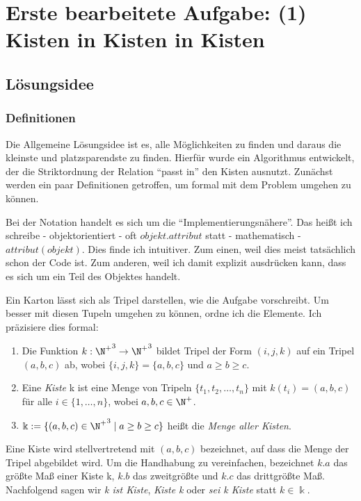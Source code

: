 \section{Erste bearbeitete Aufgabe: (1) Kisten in Kisten in Kisten}
\subsection{Lösungsidee}
\subsubsection{Definitionen}
Die Allgemeine Lösungsidee ist es, alle Möglichkeiten zu finden und daraus die kleinste und platzsparendste zu finden.
Hierfür wurde ein Algorithmus entwickelt, der die Striktordnung der Relation ``passt in'' den Kisten ausnutzt.
Zunächst werden ein paar Definitionen getroffen, um formal mit dem Problem umgehen zu können.
\begin{bem}
 Bei der Notation handelt es sich um die ``Implementierungsnähere''.
 Das heißt ich schreibe - objektorientiert - oft $objekt.attribut$ statt - mathematisch - $attribut(objekt)$.
 Dies finde ich intuitiver. Zum einen, weil dies meist tatsächlich schon der Code ist.
 Zum anderen, weil ich damit explizit ausdrücken kann, dass es sich um ein Teil des Objektes handelt.
\end{bem}
Ein Karton lässt sich als Tripel darstellen, wie die Aufgabe vorschreibt. Um besser mit diesen Tupeln umgehen zu können,
ordne ich die Elemente. Ich präzisiere dies formal:
\begin{defi}[Kiste] \hfill
\begin{enumerate}
 \item Die Funktion $k: {\N^+}^3 \to {\N^+}^3$ bildet Tripel der Form $(i,j,k)$ auf ein Tripel $(a,b,c)$ ab, wobei $\{i,j,k\} = \{a,b,c\}$ und $a \geq b \geq c$.
 \item Eine \emph{Kiste} k ist eine Menge von Tripeln $\{t_1, t_2, \dots, t_n\}$ mit $k(t_i) = (a,b,c)$ für alle $i \in \{1,\dots,n\}$, wobei $a,b,c \in \N^+$.
 \item $\Bbbk := \{(a,b,c) \in {\N^+}^3 \mid a \geq b \geq c\}$ heißt die \emph{Menge aller Kisten}.
\end{enumerate}
\end{defi}
\begin{bem}
 Eine Kiste wird stellvertretend mit $(a,b,c)$ bezeichnet, auf dass die Menge der Tripel abgebildet wird. 
 Um die Handhabung zu vereinfachen, bezeichnet $k.a$ das größte Maß einer Kiste k, $k.b$ das zweitgrößte und $k.c$ das drittgrößte Maß. \\
 Nachfolgend sagen wir \emph{k ist Kiste}, \emph{Kiste k} oder \emph{sei k Kiste} statt $k \in \Bbbk$. 
\end{bem}

